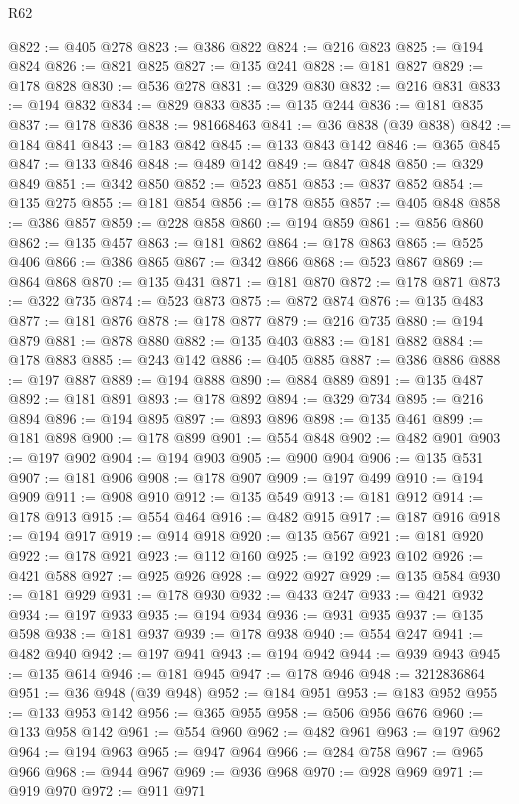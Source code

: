 \begin{lexlean}{R62}
\begin{coremodule}
@822 := @405 @278
@823 := @386 @822
@824 := @216 @823
@825 := @194 @824
@826 := @821 @825
@827 := @135 @241
@828 := @181 @827
@829 := @178 @828
@830 := @536 @278
@831 := @329 @830
@832 := @216 @831
@833 := @194 @832
@834 := @829 @833
@835 := @135 @244
@836 := @181 @835
@837 := @178 @836
@838 := 981668463
@841 := @36 @838 (@39 @838)
@842 := @184 @841
@843 := @183 @842
@845 := @133 @843 @142
@846 := @365 @845
@847 := @133 @846
@848 := @489 @142
@849 := @847 @848
@850 := @329 @849
@851 := @342 @850
@852 := @523 @851
@853 := @837 @852
@854 := @135 @275
@855 := @181 @854
@856 := @178 @855
@857 := @405 @848
@858 := @386 @857
@859 := @228 @858
@860 := @194 @859
@861 := @856 @860
@862 := @135 @457
@863 := @181 @862
@864 := @178 @863
@865 := @525 @406
@866 := @386 @865
@867 := @342 @866
@868 := @523 @867
@869 := @864 @868
@870 := @135 @431
@871 := @181 @870
@872 := @178 @871
@873 := @322 @735
@874 := @523 @873
@875 := @872 @874
@876 := @135 @483
@877 := @181 @876
@878 := @178 @877
@879 := @216 @735
@880 := @194 @879
@881 := @878 @880
@882 := @135 @403
@883 := @181 @882
@884 := @178 @883
@885 := @243 @142
@886 := @405 @885
@887 := @386 @886
@888 := @197 @887
@889 := @194 @888
@890 := @884 @889
@891 := @135 @487
@892 := @181 @891
@893 := @178 @892
@894 := @329 @734
@895 := @216 @894
@896 := @194 @895
@897 := @893 @896
@898 := @135 @461
@899 := @181 @898
@900 := @178 @899
@901 := @554 @848
@902 := @482 @901
@903 := @197 @902
@904 := @194 @903
@905 := @900 @904
@906 := @135 @531
@907 := @181 @906
@908 := @178 @907
@909 := @197 @499
@910 := @194 @909
@911 := @908 @910
@912 := @135 @549
@913 := @181 @912
@914 := @178 @913
@915 := @554 @464
@916 := @482 @915
@917 := @187 @916
@918 := @194 @917
@919 := @914 @918
@920 := @135 @567
@921 := @181 @920
@922 := @178 @921
@923 := @112 @160
@925 := @192 @923 @102
@926 := @421 @588
@927 := @925 @926
@928 := @922 @927
@929 := @135 @584
@930 := @181 @929
@931 := @178 @930
@932 := @433 @247
@933 := @421 @932
@934 := @197 @933
@935 := @194 @934
@936 := @931 @935
@937 := @135 @598
@938 := @181 @937
@939 := @178 @938
@940 := @554 @247
@941 := @482 @940
@942 := @197 @941
@943 := @194 @942
@944 := @939 @943
@945 := @135 @614
@946 := @181 @945
@947 := @178 @946
@948 := 3212836864
@951 := @36 @948 (@39 @948)
@952 := @184 @951
@953 := @183 @952
@955 := @133 @953 @142
@956 := @365 @955
@958 := @506 @956 @676
@960 := @133 @958 @142
@961 := @554 @960
@962 := @482 @961
@963 := @197 @962
@964 := @194 @963
@965 := @947 @964
@966 := @284 @758
@967 := @965 @966
@968 := @944 @967
@969 := @936 @968
@970 := @928 @969
@971 := @919 @970
@972 := @911 @971

\end{coremodule}
\end{lexlean}
